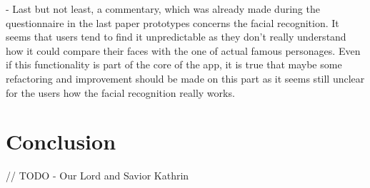 \documentclass[12pt]{scrartcl}
\begin{document}
		- Last but not least, a commentary, which was already made during the questionnaire in the last paper prototypes concerns the facial recognition. It seems that users tend to find it unpredictable as they don’t really understand how it could compare their faces with the one of actual famous personages. Even if this functionality is part of the core of the app, it is true that maybe some refactoring and improvement should be made on this part as it seems still unclear for the users how the facial recognition really works.

	
\section{Conclusion}

	
	// TODO - Our Lord and Savior Kathrin
	
	
\end{document}
